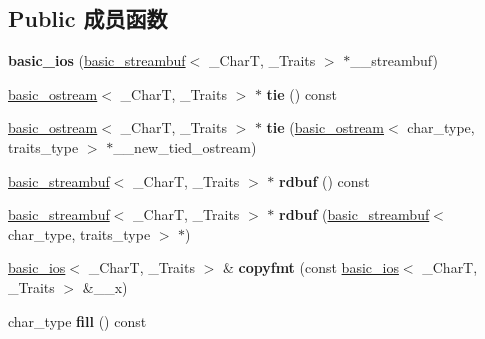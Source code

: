 \subsection*{Public 成员函数}
\begin{DoxyCompactItemize}
\item 
\mbox{\label{classbasic__ios_a10d010094267dda55a63e32ddc20f18e}} 
{\bfseries basic\+\_\+ios} (\hyperlink{classbasic__streambuf}{basic\+\_\+streambuf}$<$ \+\_\+\+CharT, \+\_\+\+Traits $>$ $\ast$\+\_\+\+\_\+streambuf)
\item 
\mbox{\label{classbasic__ios_a41ba778207c83fd0f0091c837d546356}} 
\hyperlink{classbasic__ostream}{basic\+\_\+ostream}$<$ \+\_\+\+CharT, \+\_\+\+Traits $>$ $\ast$ {\bfseries tie} () const
\item 
\mbox{\label{classbasic__ios_a81445552debbbc32356bef3291234a40}} 
\hyperlink{classbasic__ostream}{basic\+\_\+ostream}$<$ \+\_\+\+CharT, \+\_\+\+Traits $>$ $\ast$ {\bfseries tie} (\hyperlink{classbasic__ostream}{basic\+\_\+ostream}$<$ char\+\_\+type, traits\+\_\+type $>$ $\ast$\+\_\+\+\_\+new\+\_\+tied\+\_\+ostream)
\item 
\mbox{\label{classbasic__ios_a2802bf4b3dfe4a6f2e9dca16a8b10b0c}} 
\hyperlink{classbasic__streambuf}{basic\+\_\+streambuf}$<$ \+\_\+\+CharT, \+\_\+\+Traits $>$ $\ast$ {\bfseries rdbuf} () const
\item 
\mbox{\label{classbasic__ios_a2a8f435289d6b4d9007d4dc41ccd6bfc}} 
\hyperlink{classbasic__streambuf}{basic\+\_\+streambuf}$<$ \+\_\+\+CharT, \+\_\+\+Traits $>$ $\ast$ {\bfseries rdbuf} (\hyperlink{classbasic__streambuf}{basic\+\_\+streambuf}$<$ char\+\_\+type, traits\+\_\+type $>$ $\ast$)
\item 
\mbox{\label{classbasic__ios_a1bd5668c2b08eec10aa3c45b81bf2f9b}} 
\hyperlink{classbasic__ios}{basic\+\_\+ios}$<$ \+\_\+\+CharT, \+\_\+\+Traits $>$ \& {\bfseries copyfmt} (const \hyperlink{classbasic__ios}{basic\+\_\+ios}$<$ \+\_\+\+CharT, \+\_\+\+Traits $>$ \&\+\_\+\+\_\+x)
\item 
\mbox{\label{classbasic__ios_a9690e3c51d202a8f3a5b3853022b5dc1}} 
char\+\_\+type {\bfseries fill} () const

\end{DoxyCompactItemize}

